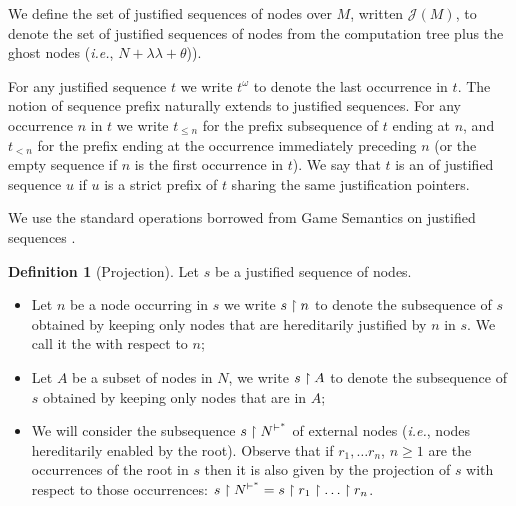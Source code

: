 \documentclass{article}
\makeatletter
\theoremstyle{definition}
\newtheorem{definition}{Definition}[section]
\newcommand\Nodes{N}%
\newcommand{\ghostlmd}{{\lambda\!\!\lambda}}
\newcommand{\ghostvar}{\theta}
\newcommand{\enables}{\vdash} %
\newcommand{\NodeHjByRoot}{\Nodes^{\enables^*}} %
\renewcommand\ie{{\it i.e.\@\xspace}}
\def\justseqset{\mathcal{J}}
\makeatother
\begin{document}
We define the set of justified sequences of nodes over $M$, written $\justseqset(M)$, to denote the set of justified sequences of nodes from the computation tree plus the ghost nodes (\ie, $\Nodes + \ghostlmd + \ghostvar$)).

For any justified sequence $t$ we write $t^\omega$ to denote the last occurrence in $t$. The notion of sequence prefix naturally extends to justified sequences.
For any occurrence $n$ in $t$ we write $t_{\leq n}$ for the prefix subsequence of $t$ ending at $n$, and $t_{<n}$ for the prefix ending at the occurrence immediately preceding $n$ (or the empty sequence if $n$ is the first occurrence in $t$).
 We say that $t$ is an  of justified sequence $u$ if $u$ is a strict prefix of $t$ sharing the same justification pointers.

We use the standard operations borrowed from Game Semantics on justified sequences \cite{Abr02}.

\begin{definition}[Projection]
Let $s$ be a justified sequence of nodes.

\begin{itemize}
\item Let $n$ be a node occurring in $s$ we write $s\upharpoonright n$ to denote the subsequence of $s$ obtained by keeping only nodes that are hereditarily justified by $n$ in $s$. We call it the  with respect to $n$;

 \item Let $A$ be a subset of nodes in $\Nodes$, we write $s \upharpoonright A$ to denote the subsequence of $s$ obtained by keeping only nodes that are in $A$;

 \item We will consider the subsequence $s\filter\NodeHjByRoot$ of external nodes (\ie, nodes hereditarily enabled by the root). Observe that if $r_1, \ldots r_n$, $n\geq 1$ are the occurrences of the root in $s$ then it is also given by the projection of $s$ with respect to those occurrences: $s\filter\NodeHjByRoot = s\filter r_1 \filter \ldots \filter r_n$.
\end{itemize}
\end{definition}
\end{document}
